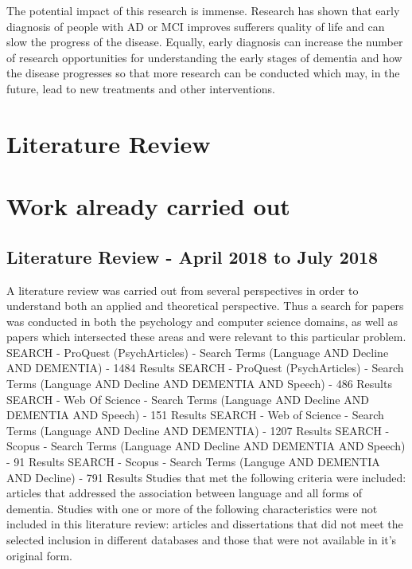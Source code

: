 \documentclass{article}
\begin{document}
	\newline
	\par
	The potential impact of this research is immense. Research has shown that early diagnosis of people with AD or MCI improves sufferers quality of life and can slow the progress of the disease. Equally, early diagnosis can increase the number of research opportunities for understanding the early stages of dementia and how the disease progresses so that more research can be conducted which may, in the future, lead to new treatments and other interventions.
	
	\section{Literature Review}
	
	\section{Work already carried out}
	
	\subsection{Literature Review - April 2018 to July 2018}
	A literature review was carried out from several perspectives in order to understand both an applied and theoretical perspective. Thus a search for papers was conducted in both the psychology and computer science domains, as well as papers which intersected these areas and were relevant to this particular problem.
	\newline
	SEARCH - ProQuest (PsychArticles) - Search Terms (Language AND Decline AND DEMENTIA) - 1484 Results \newline
	SEARCH - ProQuest (PsychArticles) - Search Terms (Language AND Decline AND DEMENTIA AND Speech) - 486 Results \newline
	SEARCH - Web Of Science - Search Terms (Language AND Decline AND DEMENTIA AND Speech) - 151 Results\newline
	SEARCH - Web of Science - Search Terms (Language AND Decline AND DEMENTIA) - 1207 Results\newline
	SEARCH - Scopus - Search Terms (Language AND Decline AND DEMENTIA AND Speech) - 91 Results\newline 
	SEARCH - Scopus - Search Terms (Languge AND DEMENTIA AND Decline) - 791 Results
	\newline
	Studies that met the following criteria were included: articles that addressed the association between language and all forms of dementia. Studies with one or more of the following characteristics were not included in this literature review: articles and dissertations that did not meet the selected inclusion in different databases and those that were not available in it's original form. 	
		
\end{document}
